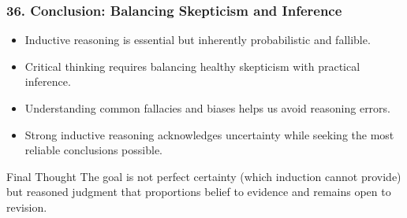 \documentclass{beamer}
\begin{document}
\begin{frame}
\frametitle{36. Conclusion: Balancing Skepticism and Inference}
\begin{itemize}
    \item Inductive reasoning is essential but inherently probabilistic and fallible.
    \item Critical thinking requires balancing healthy skepticism with practical inference.
    \item Understanding common fallacies and biases helps us avoid reasoning errors.
    \item Strong inductive reasoning acknowledges uncertainty while seeking the most reliable conclusions possible.
\end{itemize}

\begin{block}{Final Thought}
The goal is not perfect certainty (which induction cannot provide) but reasoned judgment that proportions belief to evidence and remains open to revision.
\end{block}
\end{frame}
\end{document}
